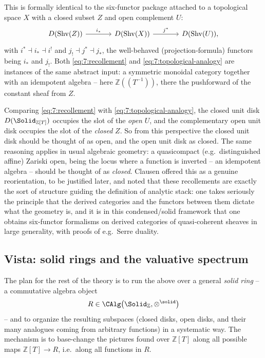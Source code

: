 This is formally identical to the six-functor package attached to a
topological space $X$ with a closed subset $Z$ and open complement $U$:
\begin{equation}
\label{eq:7:topological-analogy}
\begin{tikzcd}[column sep=large]
D(\mathrm{Shv}(Z)) \arrow[r, "i_{*}"] & D(\mathrm{Shv}(X))
\arrow[r, "j^{*}"] & D(\mathrm{Shv}(U)),
\end{tikzcd}
\end{equation}
with $i^{*}\dashv i_{*}\dashv i^{!}$ and $j_{!}\dashv j^{*}\dashv j_{*}$, the
well-behaved (projection-formula) functors being $i_{*}$ and $j_{!}$. Both
\eqref{eq:7:recollement} and \eqref{eq:7:topological-analogy} are instances of
the same abstract input: a symmetric monoidal category together with an
idempotent algebra -- here $\mathbb{Z}(\!(T^{-1})\!)$, there the pushforward
of the constant sheaf from $Z$.

\begin{remark}
\label{rmk:7:verdict}
Comparing \eqref{eq:7:recollement} with \eqref{eq:7:topological-analogy}, the
closed unit disk $D(\Solid_{\mathbb{Z}[T]})$ occupies the slot of the
\emph{open} $U$, and the complementary open unit disk occupies the slot of the
\emph{closed} $Z$. So from this perspective the closed unit disk should be
thought of as open, and the open unit disk as closed. The same reasoning
applies in usual algebraic geometry: a quasicompact (e.g.\ distinguished
affine) Zariski open, being the locus where a function is inverted -- an
idempotent algebra -- should be thought of as \emph{closed}. Clausen offered
this as a genuine reorientation, to be justified later, and noted that these
recollements are exactly the sort of structure guiding the definition of
analytic stack: one takes seriously the principle that the derived categories
and the functors between them dictate what the geometry is, and it is in this
condensed/solid framework that one obtains six-functor formalisms on derived
categories of quasi-coherent sheaves in large generality, with proofs of e.g.\
Serre duality.
\end{remark}

\subsection{Vista: solid rings and the valuative spectrum}

The plan for the rest of the theory is to run the above over a general
\emph{solid ring} -- a commutative algebra object
\begin{equation*}
R\in\CAlg\bigl(\Solid_{\mathbb{Z}},\otimes^{\solid}\bigr)
\end{equation*}
-- and to organize the resulting subspaces (closed disks, open disks, and
their many analogues coming from arbitrary functions) in a systematic way. The
mechanism is to base-change the pictures found over $\mathbb{Z}[T]$ along all
possible maps $\mathbb{Z}[T]\to R$, i.e.\ along all functions in $R$.


